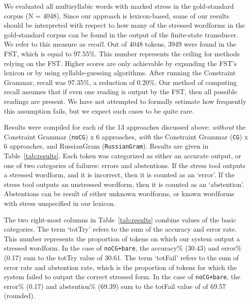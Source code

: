 \documentclass[11pt]{article}
\newcommand{\rr}[1]{\marginpar{\scriptsize R: #1}} %
\begin{document}
We evaluated all multisyllabic words with marked stress in the gold-standard corpus (N = 4048).
Since our approach is lexicon-based, some of our results should be interpreted
with respect to how many of the stressed wordforms in the gold-standard corpus
can be found in the output of the finite-state transducer. We refer to this 
measure as \emph{recall}. Out of 4048 tokens, 3949 were 
found in the FST, which is equal to 97.55\%.
This number represents the ceiling for methods relying on the FST.
Higher scores are only achievable by expanding the FST's lexicon or by using 
syllable-guessing algorithms. After running the Constraint Grammar, recall was 
97.35\%, a reduction of 0.20\%. Our method of computing recall assumes that if 
even one reading is output by the FST, then all possible readings are present.
We have not attempted to formally estimate how frequently this assumption fails, 
but we expect such cases to be quite rare.


Results were compiled for each of the 13 approaches discussed above: 
\emph{without} the Constraint Grammar ({\small {\tt noCG}}) x 6 approaches, 
\emph{with} the Constraint Grammar ({\small {\tt CG}}) x 6 approaches, 
and RussianGram ({\small {\tt RussianGram}}). Results are given in 
Table~\ref{tab:results}. Each token was categorized as either an accurate output, 
or one of two categories of failures: errors and abstentions. 
If the stress tool outputs a stressed wordform, and it is incorrect, then it is
counted as an `error'. If the stress tool outputs an unstressed wordform, then
it is counted as an `abstention'. Abstentions can be result of either unknown
wordforms, or known wordforms with stress unspecified in our lexicon.

The two right-most columns in 
Table~\ref{tab:results} combine values of the basic categories. The term `totTry' 
refers to the sum of the accuracy and error rate. This number represents the 
proportion of tokens on which our system output a stressed wordform. In the case 
of {\small {\tt noCG+bare}}, the accuracy\% (30.43) and error\% (0.17) sum to the 
totTry value of 30.61. The term `totFail' refers to the sum of error rate 
and abstention rate, which is the 
proportion of tokens for which the system failed to output the correct stressed 
form. In the case of {\small {\tt noCG+bare}}, the error\% (0.17) 
and abstention\% (69.39) sum to the totFail value of of 69.57 (rounded). 
\end{document}

